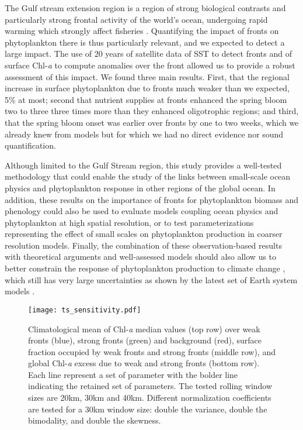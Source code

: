 \conclusions{}

The Gulf stream extension region is a region of strong biological contrasts and particularly strong frontal activity of the world's ocean, undergoing rapid warming which strongly affect fisheries \citep{pershing_2015, neto_2021}.
Quantifying the impact of fronts on phytoplankton there is thus particularly relevant, and we expected to detect a large impact.
The use of 20 years of satellite data of SST to detect fronts and of surface Chl\nobreakdash-\emph{a} to compute anomalies over the front allowed us to provide a robust assessment of this impact.
We found three main results.
First, that the regional increase in surface phytoplankton due to fronts much weaker than we expected, 5\% at most; second that nutrient supplies at fronts enhanced the spring bloom two to three three times more than they enhanced oligotrophic regions; and third, that the spring bloom onset was earlier over fronts by one to two weeks, which we already knew from models \citep{karleskind_2011, mahadevan_2012} but for which we had no direct evidence nor sound quantification.

Although limited to the Gulf Stream region, this study provides a well-tested methodology that could enable the study of the links between small-scale ocean physics and phytoplankton response in other regions of the global ocean.
In addition, these results on the importance of fronts for phytoplankton biomass and phenology could also be used to evaluate models coupling ocean physics and phytoplankton at high spatial resolution, or to test parameterizations representing the effect of small scales on phytoplankton production in coarser resolution models.
Finally, the combination of these observation-based results with theoretical arguments and well-assessed models should also allow us to better constrain the response of phytoplankton production to climate change \citep{couespel_2021}, which still has very large uncertainties as shown by the latest set of Earth system models \citep{kwiatkowski_2020}.



\appendixfigures{}

\begin{figure*}
 \texttt{[image: ts\_sensitivity.pdf]}
 \caption{
   Climatological mean of Chl\nobreakdash-\emph{a} median values (top row) over weak fronts (blue), strong fronts (green) and background (red), surface fraction occupied by weak fronts and strong fronts (middle row), and global Chl\nobreakdash-\emph{a} excess due to weak and strong fronts (bottom row).
   Each line represent a set of parameter with the bolder line indicating the retained set of parameters.
   The tested rolling window sizes are 20km, 30km and 40km.
   Different normalization coefficients are tested for a 30km window size: double the variance, double the bimodality, and double the skewness.
 }%
 \label{fig:ts-sensitivity}
\end{figure*}


